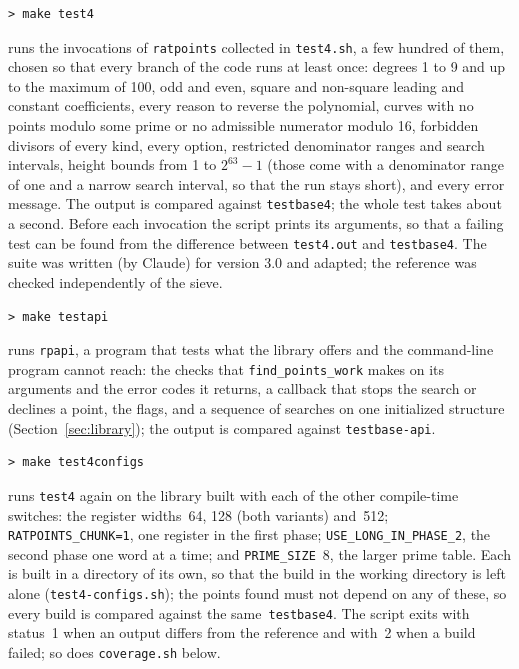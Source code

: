 \documentclass[12pt,a4paper,oneside]{amsart}
\begin{document}
\begin{verbatim}
> make test4
\end{verbatim}
runs the invocations of \texttt{ratpoints} collected in \texttt{test4.sh},
a few hundred of them, chosen so that every branch of the code runs at
least once: degrees 1 to 9 and up to the maximum of 100, odd and even, square and non-square
leading and constant coefficients, every reason to reverse the polynomial,
curves with no points modulo some prime or no admissible numerator modulo
16, forbidden divisors of every kind, every option, restricted denominator
ranges and search intervals, height bounds from 1 to $2^{63}-1$ (those come
with a denominator range of one and a narrow search interval, so that the
run stays short), and every error message.  The output is compared against
\texttt{testbase4}; the whole test takes about a second.  Before each invocation
the script prints its arguments, so that a failing test can be found from
the difference between \texttt{test4.out} and \texttt{testbase4}.  The
suite was written (by Claude) for version 3.0 and adapted; the reference was checked
independently of the sieve.

\begin{verbatim}
> make testapi
\end{verbatim}
runs \texttt{rpapi}, a program that tests what the library offers and the
command-line program cannot reach: the checks that
\texttt{find\_points\_work} makes on its arguments and the error codes it
returns, a callback that stops the search or declines a point, the flags,
and a sequence of searches on one initialized structure
(Section~\ref{sec:library}); the output is compared against
\texttt{testbase-api}.

\begin{verbatim}
> make test4configs
\end{verbatim}
runs \texttt{test4} again on the library built with each of the other
compile-time switches: the register widths~64, 128 (both variants) and~512;
\texttt{RATPOINTS\_CHUNK=1}, one register in the first phase;
\texttt{USE\_LONG\_IN\_PHASE\_2}, the second phase one word at a time;
and \texttt{PRIME\_SIZE}~8, the larger prime table.  Each is built in a
directory of its own, so that the build in the working directory is left
alone (\texttt{test4-configs.sh}); the points found must not depend on
any of these, so every build is compared against the same~\texttt{testbase4}.
The script exits with
status~1 when an output differs from the reference and with~2 when a build
failed; so does \texttt{coverage.sh} below.
\end{document}
